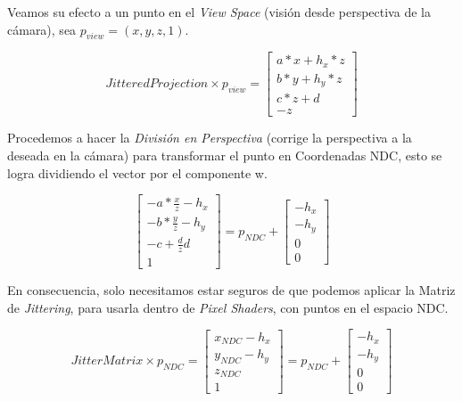 \documentclass[pregrado]{tesis-usb} %
\begin{document}
Veamos su efecto a un punto en el \textit{View Space} (visión desde perspectiva de la cámara), sea $p_{view}=(x,y,z,1)$.

\begin{equation}
	JitteredProjection\times p_{view} = \begin{bmatrix*}
	a*x+h_x*z \\
	b*y+h_y*z \\
	c*z+d \\
	-z
	\end{bmatrix*}
\end{equation}

Procedemos a hacer la \textit{División en Perspectiva} (corrige la perspectiva a la deseada en la cámara) para transformar el punto en Coordenadas NDC, esto se logra dividiendo el vector por el componente w. 

\begin{equation}
\begin{bmatrix*}
-a*\frac{x}{z}-h_x \\
-b*\frac{y}{z}-h_y \\
-c+\frac{d}{z}d \\
1
\end{bmatrix*} = p_{NDC} + \begin{bmatrix*}
-h_x \\
-h_y \\
0 \\
0
\end{bmatrix*}
\end{equation}

En consecuencia, solo necesitamos estar seguros de que podemos aplicar la Matriz de \textit{Jittering}, para usarla dentro de \textit{Pixel Shaders}, con puntos en el espacio NDC.

\begin{equation}
	JitterMatrix\times p_{NDC} = \begin{bmatrix*}
	x_{NDC}-h_x \\
	y_{NDC}-h_y \\
	z_{NDC} \\
	1
	\end{bmatrix*} = p_{NDC} + \begin{bmatrix*}
	-h_x \\
	-h_y \\
	0 \\
	0
	\end{bmatrix*}
\end{equation}
\end{document}
